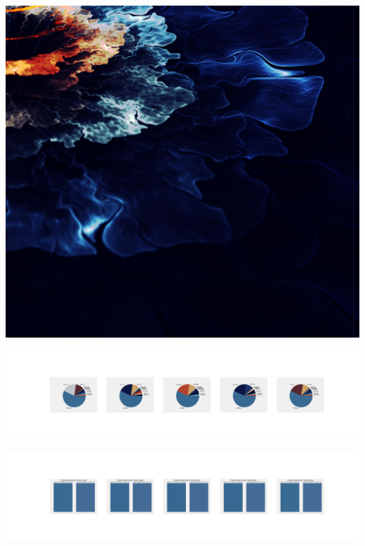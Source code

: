 \documentclass[11pt]{article}
\begin{document}
\begin{landscape}
    \begin{center}
    \includegraphics[width=\textwidth]{./nbimg/file (119).jpg}
    \end{center}

    \begin{center}
    \includegraphics[width=250mm]{./nbimg/pie-22.jpg}
    \end{center}

    \begin{center}
    \includegraphics[width=250mm]{./nbimg/peak-22.jpg}
    \end{center}
    


\end{landscape}
\end{document}
